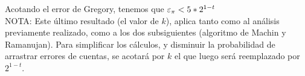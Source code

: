 	Acotando el error de Gregory, tenemos que $\varepsilon _{\pi} < 5*2^{1-t}$\\
	
	NOTA: Este último resultado (el valor de $k$), aplica tanto como al análisis previamente realizado, como a los dos subsiguientes (algoritmo de Machin y Ramanujan). Para simplificar los cálculos, y disminuir la probabilidad de arrastrar errores de cuentas, se acotará por $k$ el que luego será reemplazado por $2^{1-t}$.
